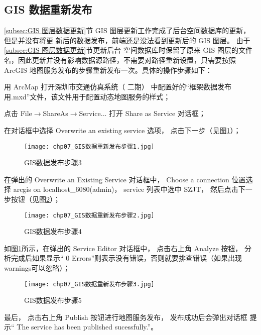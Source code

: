 \subsection{GIS 数据重新发布}
\ref{subsec:GIS 图层数据更新}节 GIS 图层更新工作完成了后台空间数据库的更新，但是并没有将更
新后的数据发布，前端还是没法看到更新后的 GIS 图层。 由于\ref{subsec:GIS 图层数据更新}节更新后台
空间数据库时保留了原来 GIS 图层的文件名，因此更新并没有影响数据源路径，不需要对路径重新设置，只需要按照 ArcGIS 地图服务发布的步骤重新发布一次。具体的操作步骤如下：

\begin{nbeae}
\item 用 ArcMap 打开深圳市交通仿真系统（ 二期） 中配置好的“框架数据发布用.mxd”文件，该文件用于配置动态地图服务的样式；
\item 点击 File$\rightarrow$ShareAs$\rightarrow$Service... 打开 Share as Service 对话框；
\item 在对话框中选择 Overwrite an existing service 选项， 点击下一步（见图\ref{fig:chp07_GIS数据重新发布步骤1}）；

\begin{figure}[!ht]
  \centering
  \texttt{[image: chp07\_GIS数据重新发布步骤1.jpg]}
  \caption{GIS数据发布步骤3\label{fig:chp07_GIS数据重新发布步骤1} }
\end{figure}

\item 在弹出的 Overwrite an Existing Service 对话框中， Choose a connection 位置选
择 arcgis on localhost\_6080(admin)， service 列表中选中 SZJT， 然后点击下一步按钮（见图\ref{fig:chp07_GIS数据重新发布步骤2}）；

\begin{figure}[!ht]
  \centering
  \texttt{[image: chp07\_GIS数据重新发布步骤2.jpg]}
  \caption{GIS数据发布步骤4\label{fig:chp07_GIS数据重新发布步骤2} }
\end{figure}

\item 如图\ref{fig:chp07_GIS数据重新发布步骤1}所示，在弹出的 Service Editor 对话框中， 点击右上角 Analyze 按钮， 分析完成后如果显示“ 0 Errors”则表示没有错误，否则就要排查错误（如果出现 warnings可以忽略）；

\begin{figure}[!ht]
  \centering
  \texttt{[image: chp07\_GIS数据重新发布步骤3.jpg]}
  \caption{GIS数据发布步骤5\label{fig:chp07_GIS数据重新发布步骤3} }
\end{figure}

\item 最后， 点击右上角 Publish 按钮进行地图服务发布， 发布成功后会弹出对话框
提示“ The service has been published sucessfully.”。
\end{nbeae}

